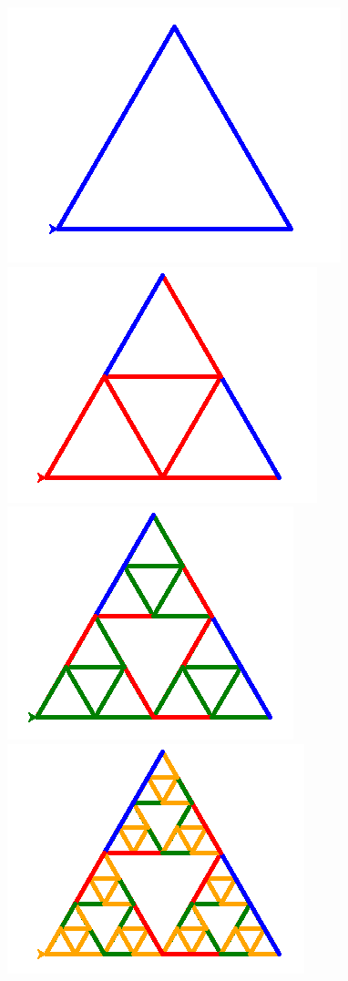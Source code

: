 \documentclass[11pt,class=report,crop=false]{standalone}
\begin{document}
\begin{activite}
\begin{center}
\includegraphics[scale=0.3]{ecran-tortue-4a}
\includegraphics[scale=0.3]{ecran-tortue-4b}
\includegraphics[scale=0.3]{ecran-tortue-4c}
\includegraphics[scale=0.3]{ecran-tortue-4d}
\end{center}


\end{activite}
\end{document}
